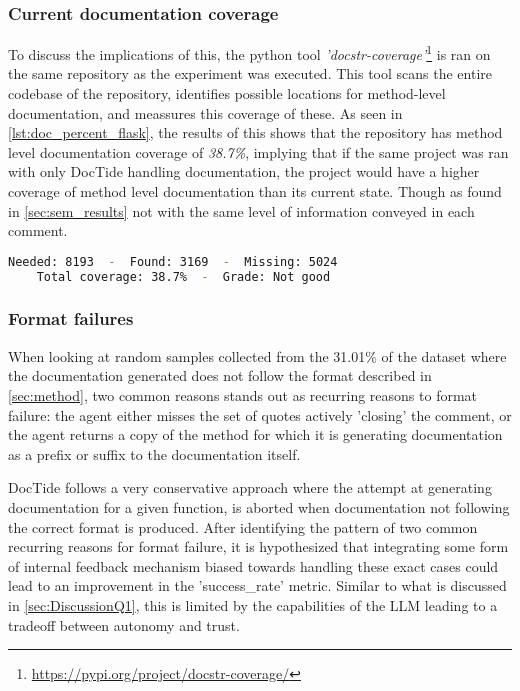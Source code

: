 \subsubsection*{Current documentation coverage}
To discuss the implications of this, the python tool \textit{'docstr-coverage'}\footnote{\url{https://pypi.org/project/docstr-coverage/}} is ran on the same repository as the experiment was executed. This tool scans the entire codebase of the repository, identifies possible locations for method-level documentation, and meassures this coverage of these. As seen in \cref{lst:doc_percent_flask}, the results of this shows that the repository has method level documentation coverage of \textit{38.7\%}, implying that if the same project was ran with only DocTide handling documentation, the project would have a higher coverage of method level documentation than its current state. Though as found in \cref{sec:sem_results} not with the same level of information conveyed in each comment.

\begin{lstlisting}[language=sh, label={lst:doc_percent_flask},      caption= Ratio of method level documentation in flask repository]
    Needed: 8193  -  Found: 3169  -  Missing: 5024
    Total coverage: 38.7%  -  Grade: Not good
\end{lstlisting}

\subsubsection*{Format failures}
When looking at random samples collected from the 31.01\% of the dataset where the documentation generated does not follow the format described in \cref{sec:method}, two common reasons stands out as recurring reasons to format failure: the agent either misses the set of quotes actively 'closing' the comment, or the agent returns a copy of the method for which it is generating documentation as a prefix or suffix to the documentation itself. 

DocTide follows a very conservative approach where the attempt at generating documentation for a given function, is aborted when documentation not following the correct format is produced. After identifying the pattern of two common recurring reasons for format failure, it is hypothesized that integrating some form of internal feedback mechanism biased towards handling these exact cases could lead to an improvement in the 'success\_rate' metric. Similar to what is discussed in \cref{sec:DiscussionQ1}, this is limited by the capabilities of the LLM leading to a tradeoff between autonomy and trust.


